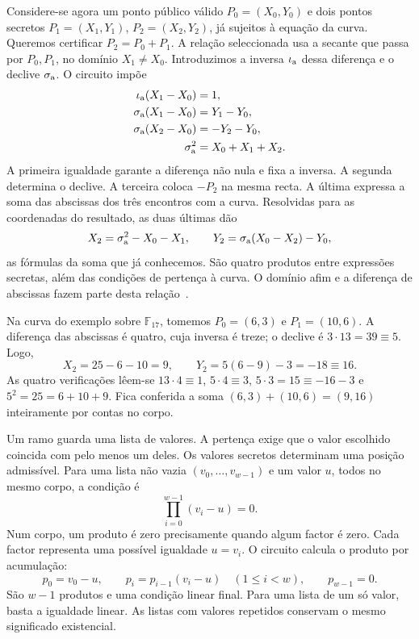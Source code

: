 Considere-se agora um ponto público válido
\(P_0=(X_0,Y_0)\) e dois pontos secretos
\(P_1=(X_1,Y_1)\), \(P_2=(X_2,Y_2)\), já sujeitos à
equação da curva. Queremos certificar \(P_2=P_0+P_1\).
A relação seleccionada usa a secante que passa por
\(P_0,P_1\), no domínio \(X_1\ne X_0\).
Introduzimos a inversa \(\iota_{\rm a}\) dessa diferença
e o declive \(\sigma_{\rm a}\). O circuito impõe
\begin{equation}
 \begin{aligned}
 \iota_{\rm a}(X_1-X_0)&=1,\\
 \sigma_{\rm a}(X_1-X_0)&=Y_1-Y_0,\\
 \sigma_{\rm a}(X_2-X_0)&=-Y_2-Y_0,\\
 \sigma_{\rm a}^2&=X_0+X_1+X_2.
 \end{aligned}
 \label{eq:fcmp-circuit-addition}
\end{equation}
A primeira igualdade garante a diferença não nula e fixa
a inversa. A segunda determina o declive. A terceira coloca
\(-P_2\) na mesma recta. A última expressa a soma das
abscissas dos três encontros com a curva. Resolvidas para
as coordenadas do resultado, as duas últimas dão
\[
 X_2=\sigma_{\rm a}^2-X_0-X_1,\qquad
 Y_2=\sigma_{\rm a}(X_0-X_2)-Y_0,
\]
as fórmulas da soma que já conhecemos. São quatro produtos
entre expressões secretas, além das condições de pertença
à curva. O domínio afim e a diferença de abscissas fazem
parte desta relação~\cite{monero-oxide-fcmp-source}.

Na curva do exemplo sobre \(\mathbb F_{17}\), tomemos
\(P_0=(6,3)\) e \(P_1=(10,6)\). A diferença das
abscissas é quatro, cuja inversa é treze; o declive é
\(3\cdot13=39\equiv5\). Logo,
\[
 X_2=25-6-10=9,\qquad
 Y_2=5(6-9)-3=-18\equiv16.
\]
As quatro verificações lêem-se
\(13\cdot4\equiv1\), \(5\cdot4\equiv3\),
\(5\cdot3=15\equiv-16-3\) e
\(5^2=25=6+10+9\). Fica conferida a soma
\((6,3)+(10,6)=(9,16)\) inteiramente por contas no corpo.


Um ramo guarda uma lista de valores. A pertença exige que
o valor escolhido coincida com pelo menos um deles. Os valores
secretos determinam uma posição admissível. Para uma lista não vazia
\((v_0,\ldots,v_{w-1})\) e um valor \(u\), todos no
mesmo corpo, a condição é
\begin{equation}
 \prod_{i=0}^{w-1}(v_i-u)=0.
 \label{eq:fcmp-list-membership}
\end{equation}
Num corpo, um produto é zero precisamente quando algum
factor é zero. Cada factor representa uma possível igualdade
\(u=v_i\). O circuito calcula o produto por acumulação:
\[
 p_0=v_0-u,\qquad
 p_i=p_{i-1}(v_i-u)\quad(1\leq i<w),\qquad
 p_{w-1}=0.
\]
São \(w-1\) produtos e uma condição linear final. Para
uma lista de um só valor, basta a igualdade linear.
As listas com valores repetidos conservam o mesmo significado
existencial.

